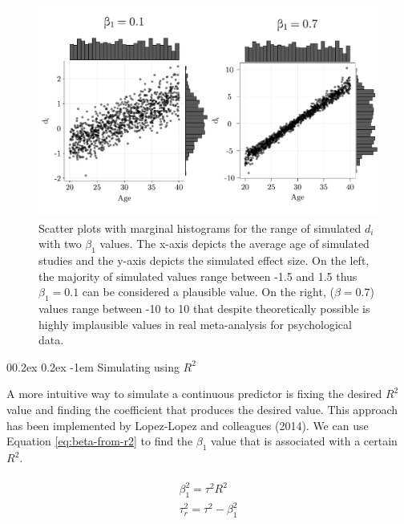 \documentclass[
  man,floatsintext]{apa6}
\makeatletter
\let\oldparagraph\paragraph
\renewcommand{\paragraph}[1]{\oldparagraph{#1}\mbox{}}
\renewcommand{\paragraph}{\@startsection{paragraph}{4}{\parindent}%
  {0\baselineskip \@plus 0.2ex \@minus 0.2ex}%
  {-1em}%
  {\normalfont\normalsize\bfseries\itshape\typesectitle}}
\makeatother
\begin{document}
\normalsize

\scriptsize

\begin{figure}[H]

{\centering \includegraphics[width=0.8\linewidth]{paper_files/figure-latex/plot-meta-reg-plausible-implausible-1} 

}

\caption{Scatter plots with marginal histograms for the range of simulated \(d_i\) with two \(\beta_1\) values. The x-axis depicts the average age of simulated studies and the y-axis depicts the simulated effect size. On the left, the majority of simulated values range between -1.5 and 1.5 thus \(\beta_1 = 0.1\) can be considered a plausible value. On the right, (\(\beta = 0.7\)) values range between -10 to 10 that despite theoretically possible is highly implausible values in real meta-analysis for psychological data.}\label{fig:plot-meta-reg-plausible-implausible}
\end{figure}

\normalsize

\hypertarget{simulating-using-r2}{%
\paragraph{\texorpdfstring{Simulating using \(R^2\)}{Simulating using R\^{}2}}\label{simulating-using-r2}}

A more intuitive way to simulate a continuous predictor is fixing the desired \(R^{2}\) value and finding the coefficient that produces the desired value. This approach has been implemented by Lopez-Lopez and colleagues (2014). We can use Equation \eqref{eq:beta-from-r2} to find the \(\beta_{1}\) value that is associated with a certain \(R^{2}\).

\begin{align}
\begin{aligned}
\beta^2_1 = \tau^2R^2 \\
\tau^2_{r} = \tau^2 - \beta^2_1
\label{eq:beta-from-r2}
\end{aligned}
\end{align}
\end{document}
